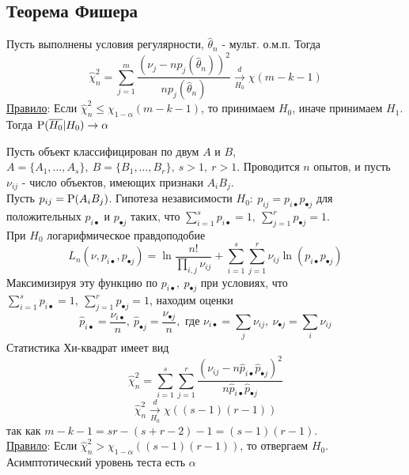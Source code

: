 \subsection{Теорема Фишера}
Пусть выполнены условия регулярности, $\widehat{\theta}_n$ - мульт. о.м.п. Тогда
\[ \widehat{\chi}_n^2=\sum_{j=1}^m\frac{(\nu_j-np_j(\widehat{\theta}_n))^2}{np_j(\widehat{\theta}_n)}\xrightarrow[H_0]{d}\chi(m-k-1) \]
\underline{Правило}: Если $\widehat{\chi}_n^2\leq\chi_{1-\alpha}(m-k-1)$, то принимаем $H_0$, иначе принимаем $H_1$.
Тогда $\P(\overline{H_0}\vert H_0)\rightarrow\alpha$
\begin{example}
    Пусть объект классифицирован по двум $A$ и $B$,
    $A=\{A_1,\ldots,A_s\},\ B=\{B_1,\ldots,B_r\},\ s>1,\ r>1$.
    Проводится $n$ опытов, и пусть $\nu_{ij}$ - число объектов,
    имеющих признаки $A_iB_j$. \\
    Пусть $p_{ij}=\P(A_iB_j)$. Гипотеза независимости
    $H_0:\ p_{ij}=p_{i\bullet}p_{\bullet j}$ для положительных $p_{i\bullet}$ и $p_{\bullet j}$
    таких, что $\sum_{i=1}^sp_{i\bullet}=1,\ \sum_{j=1}^rp_{\bullet j}=1$. \\
    При $H_0$ логарифмическое правдоподобие
    \[L_n(\nu,p_{i\bullet},p_{\bullet j})=\ln\frac{n!}{\prod_{i,j}\nu_{ij}}+\sum_{i=1}^s\sum_{j=1}^r\nu_{ij}\ln(p_{i\bullet}p_{\bullet j})\]
    Максимизируя эту функцию по $p_{i\bullet},\ p_{\bullet j}$ при условиях, что $\sum_{i=1}^sp_{i\bullet}=1,\ \sum_{j=1}^rp_{\bullet j}=1$,
    находим оценки
    \[\widehat{p}_{i\bullet}=\frac{\nu_{i\bullet}}{n},\ \widehat{p}_{\bullet j}=\frac{\nu_{\bullet j}}{n},\text{ где } \nu_{i\bullet}=\sum_{j}\nu_{ij},\ \nu_{\bullet j}=\sum_{i}\nu_{ij}\]
    Статистика Хи-квадрат имеет вид
    \[\widehat{\chi}_n^2=\sum_{i=1}^s\sum_{j=1}^r\frac{(\nu_{ij}-n\widehat{p}_{i\bullet}\widehat{p}_{\bullet j})^2}{n\widehat{p}_{i\bullet}\widehat{p}_{\bullet j}}\]
    \[\widehat{\chi}_n^2\xrightarrow[H_0]{d}\chi((s-1)(r-1))\]
    так как $m-k-1=sr-(s+r-2)-1=(s-1)(r-1)$. \\
    \underline{Правило}: Если $\widehat{\chi}_n^2>\chi_{1-\alpha}((s-1)(r-1))$,
    то отвергаем $H_0$. Асимптотический уровень теста есть $\alpha$
\end{example}
